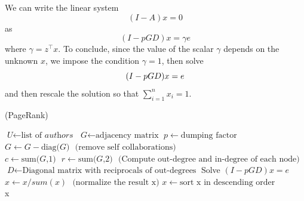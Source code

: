 \documentclass[]{usiinfbachelorproject}
\newcommand\transp[1]{{#1}^{\top}}
\begin{document}
We can write the linear system
$$(I-A)x=0$$
as
$$(I - pGD)x = \gamma e$$
where $\gamma = \transp{z}x$.
To conclude, since the value of the scalar $\gamma$ depends on the unknown $x$, we impose the condition $\gamma = 1$, then solve
\begin{equation}\notag
(I - pGD)x = e
\end{equation}
and then rescale the solution so that $\sum\limits_{i=1}^{n} x_i = 1$.

\begin{algorithm}
\caption{ (PageRank)}\label{pagerank}
\begin{algorithmic}[1]
\State $\textit{U} \gets \text{list of }\textit{authors}$
\State $\textit{G} \gets \text{adjacency matrix}$
\State $p \gets \text{dumping factor}$
\State $\textit{G} \gets \textit{G} - \text{diag(}\textit{G}\text{)} \: \: \: \text{(remove self collaborations)}$
\State $\textit{c} \gets \text{sum(}\textit{G}\text{,1)} \:\:\: \textit{r} \gets \text{sum(}\textit{G}\text{,2)} \:\:\: \text{(Compute out-degree and in-degree of each node)}$
\State $\textit{D} \gets \text{Diagonal matrix with reciprocals of out-degrees}$
\State Solve $(I - pGD)x = e$
\State $x \gets x / sum(x) \: \:\: \text{(normalize the result x)}$
\State $x \gets \text{sort x in descending order}$\\
\Return x
\EndProcedure
\end{algorithmic}
\end{algorithm}
\end{document}

